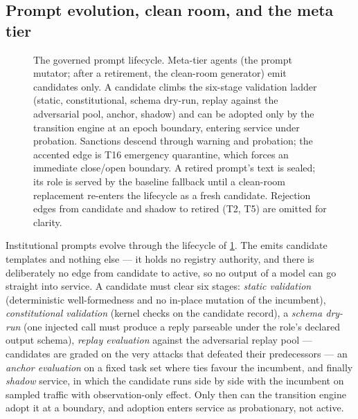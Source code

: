\subsection{Prompt evolution, clean room, and the meta tier}\label{sec:rqgm:prompts}

\begin{figure}[t]
  \centering
  \resizebox{\columnwidth}{!}{}
  \caption{The governed prompt lifecycle. Meta-tier agents (the
    prompt mutator; after a retirement, the clean-room generator)
    emit candidates only. A candidate climbs the six-stage validation
    ladder (static, constitutional, schema dry-run, replay against
    the adversarial pool, anchor, shadow) and can be adopted only by
    the transition engine at an epoch boundary, entering service
    under probation. Sanctions descend through warning and probation;
    the accented edge is T16 emergency quarantine, which forces an
    immediate close/open boundary. A retired prompt's text is sealed; its role is
    served by the baseline fallback until a clean-room replacement
    re-enters the lifecycle as a fresh candidate. Rejection edges
    from candidate and shadow to retired (T2, T5) are omitted for
    clarity.}
  \label{fig:prompt-lifecycle}
\end{figure}

Institutional prompts evolve through the lifecycle of
\cref{fig:prompt-lifecycle}. The  emits
candidate templates and nothing else --- it holds no registry
authority, and there is deliberately no edge from candidate to
active, so no output of a model can go straight into service. A
candidate must clear six stages: \emph{static validation}
(deterministic well-formedness and no in-place mutation of the
incumbent), \emph{constitutional validation} (kernel checks on the
candidate record), a \emph{schema dry-run} (one injected call must
produce a reply parseable under the role's declared output schema),
\emph{replay evaluation} against the adversarial replay pool ---
candidates are graded on the very attacks that defeated their
predecessors --- an \emph{anchor evaluation} on a fixed task set
where ties favour the incumbent, and finally \emph{shadow} service,
in which the candidate runs side by side with the incumbent on
sampled traffic with observation-only effect. Only then can the
transition engine adopt it at a boundary, and adoption enters service
as probationary, not active.

